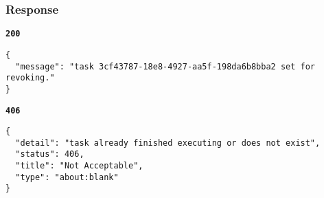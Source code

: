 \subsubsection{Response}
\textbf{\texttt{200}}
\begin{lstlisting}
{
  "message": "task 3cf43787-18e8-4927-aa5f-198da6b8bba2 set for revoking."
}
\end{lstlisting}

\textbf{\texttt{406}}
\begin{lstlisting}
{
  "detail": "task already finished executing or does not exist",
  "status": 406,
  "title": "Not Acceptable",
  "type": "about:blank"
}
\end{lstlisting}